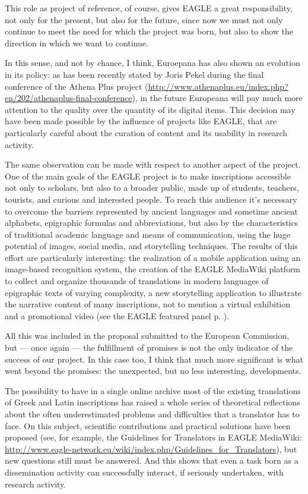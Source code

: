 This role as project of reference, of course, gives EAGLE a great responsibility, not only for the present, but also for the future, since now we must not only continue to meet the need for which the project was born, but also to show the direction in which we want to continue.

In this sense, and not by chance, I think, Euroepana has also shown an evolution in its policy: as has been recently stated by Joris Pekel during the final conference of the Athena Plus project (\url{http://www.athenaplus.eu/index.php?en/202/athenaplus-final-conference}), in the future Europeana will pay much more attention to the quality over the quantity of its digital items. This decision may have been made possible by the influence of projects like EAGLE, that are particularly careful about the curation of content and its usability in research activity.

The same observation can be made with respect to another aspect of the project. One of the main goals of the EAGLE project is to make inscriptions accessible not only to scholars, but also to a broader public, made up of students, teachers, tourists, and curious and interested people. To reach this audience it’s necessary to overcome the barriers represented by ancient languages and sometime ancient alphabets, epigraphic formulas and abbreviations, but also by the characteristics of traditional academic language and means of communication, using the huge potential of images, social media, and storytelling techniques. The results of this effort are particularly interesting: the realization of a mobile application using an image-based recognition system, the creation of the EAGLE MediaWiki platform to collect and organize thousands of translations in modern languages of epigraphic texts of varying complexity, a new storytelling application to illustrate the narrative content of many inscriptions, not to mention a virtual exhibition and a promotional video (see the EAGLE featured panel p. \pageref{peaglepanel}).

All this was included in the proposal submitted to the European Commission, but --- once again --- the fulfillment of promises is not the only indicator of the success of our project.  In this case too, I think that much more significant is what went beyond the promises: the unexpected, but no less interesting, developments. 

The possibility to have in a single online archive most of the existing translations of Greek and Latin inscriptions has raised a whole series of theoretical reflections about the often underestimated problems and difficulties that a translator has to face. On this subject, scientific contributions and practical solutions have been proposed (see, for example, the Guidelines for Translators in EAGLE MediaWiki: \url{http://www.eagle-network.eu/wiki/index.php/Guidelines_for_Translators}), but new questions still must be answered. And this shows that even a task born as a dissemination activity can successfully interact, if seriously undertaken, with research activity.

